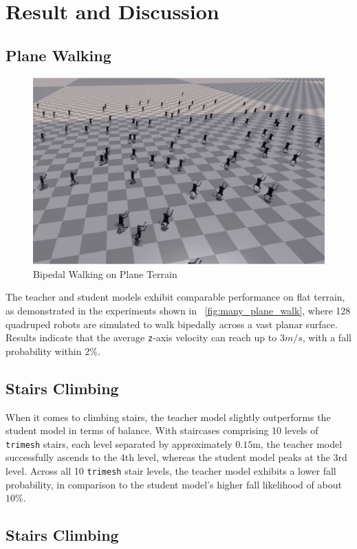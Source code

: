 \documentclass{article} %
\begin{document}
\section{Result and Discussion}

\subsection{Plane Walking}

\begin{figure}[H]
   \centering
   \includegraphics[width=1.0\textwidth]{many_plane_walk.pdf}
   \caption{Bipedal Walking on Plane Terrain}
   \label{fig:many_plane_walk}
\end{figure}

The teacher and student models exhibit comparable performance on flat terrain, as demonstrated in the experiments shown in ~\autoref{fig:many_plane_walk}, where 128 quadruped robots are simulated to walk bipedally across a vast planar surface. Results indicate that the average \texttt{z}-axis velocity can reach up to $3m/s$, with a fall probability within $2\%$.

\subsection{Stairs Climbing}

When it comes to climbing stairs, the teacher model slightly outperforms the student model in terms of balance. With staircases comprising 10 levels of \texttt{trimesh} stairs, each level separated by approximately $0.15$m, the teacher model successfully ascends to the 4th level, whereas the student model peaks at the 3rd level. Across all 10 \texttt{trimesh} stair levels, the teacher model exhibits a lower fall probability, in comparison to the student model's higher fall likelihood of about $10\%$.

\subsection{Stairs Climbing}




\appendix
\end{document}
